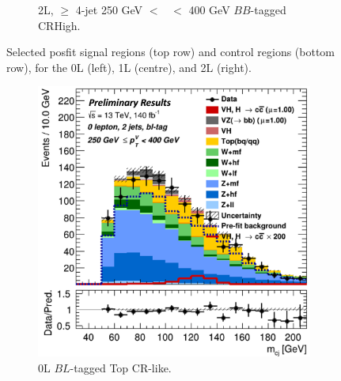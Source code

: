 \begin{figure}[h!]
\begin{subfigure}[b]{0.32\textwidth}
        \caption{2L, $\geq$ 4-jet 250 GeV $<$ \ptv\ $<$ 400 GeV $BB$-tagged CRHigh.}
        \label{fig:posfit_2L_CR}
    \end{subfigure}
    \caption{Selected posfit signal regions (top row) and control regions (bottom row), for the 0L (left), 1L (centre), and 2L (right).}
    \label{fig:postfit_SR_CR}
\end{figure} 

\begin{figure}[h!]
    \centering
    \begin{subfigure}[b]{0.32\textwidth}
        \centering
        \includegraphics[width=\textwidth]{Images/VH/Fit/fromSlides/Postfit/0LtopCRBL.png}
        \caption{0L $BL$-tagged Top CR-like.}
        \label{fig:val_BLtopCR}
    \end{subfigure}
    \begin{subfigure}[b]{0.32\textwidth}
        \centering

\end{subfigure}
\end{figure}
